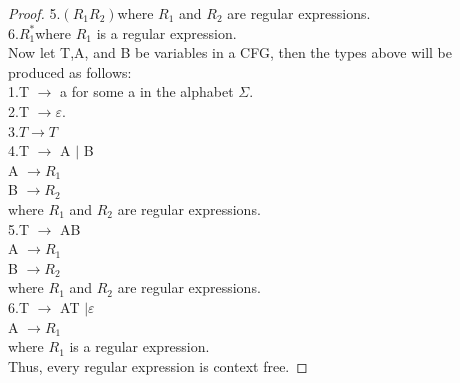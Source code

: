 \documentclass[10pt] {article}
\begin{document}
\begin{enumerate}
\begin{proof}
5.$(R_1R_2)$where $R_1$ and $R_2$ are regular expressions.\\
6.$R_1^*$where $R_1$ is a regular expression.\\
Now let T,A, and B be variables in a CFG, then the types above will be produced as follows:\\
1.T $\rightarrow$ a for some a in the alphabet $\Sigma$.\\
2.T $\rightarrow \varepsilon$.\\
3.$T \rightarrow T$\\
4.T $\rightarrow$ A $\mid$ B\\
A $\rightarrow R_1$\\
B $\rightarrow R_2$\\
where $R_1$ and $R_2$ are regular expressions.\\ 
5.T $\rightarrow$ AB\\
A $\rightarrow R_1$\\
B $\rightarrow R_2$\\
where $R_1$ and $R_2$ are regular expressions.\\ 
6.T $\rightarrow$ AT $\mid \varepsilon$\\
A $\rightarrow R_1$\\
where $R_1$ is a  regular expression.\\ 
Thus, every regular expression is context free.
\end{proof}
\end{enumerate}
\end{document}
